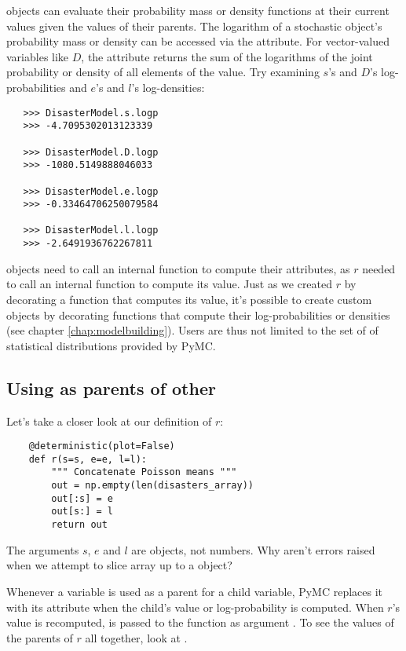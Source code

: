  objects can evaluate their probability mass or density functions at their current values given the values of their parents. The logarithm of a stochastic object's probability mass or density can be accessed via the  attribute. For vector-valued variables like $D$, the  attribute returns the sum of the logarithms of the joint probability or density of all elements of the value. Try examining $s$'s and $D$'s log-probabilities and $e$'s and $l$'s log-densities:
\begin{verbatim}
   >>> DisasterModel.s.logp
   >>> -4.7095302013123339

   >>> DisasterModel.D.logp
   >>> -1080.5149888046033

   >>> DisasterModel.e.logp
   >>> -0.33464706250079584

   >>> DisasterModel.l.logp
   >>> -2.6491936762267811
\end{verbatim}
 objects need to call an internal function to compute their  attributes, as $r$ needed to call an internal function to compute its value. Just as we created $r$ by decorating a function that computes its value, it's possible to create custom  objects by decorating functions that compute their log-probabilities or densities (see chapter \ref{chap:modelbuilding}). Users are thus not limited to the set of of statistical distributions provided by PyMC.

\subsection[Using Variables as parents of other Variables]{Using
 as parents of other }

Let's take a closer look at our definition of $r$:
\begin{verbatim}
	@deterministic(plot=False)
	def r(s=s, e=e, l=l):
	    """ Concatenate Poisson means """
	    out = np.empty(len(disasters_array))
	    out[:s] = e
	    out[s:] = l
	    return out
\end{verbatim}
The arguments $s$, $e$ and $l$ are  objects, not numbers. Why aren't errors raised when we attempt to slice array  up to a  object?

Whenever a variable is used as a parent for a child variable, PyMC replaces it with its  attribute when the child's value or log-probability is computed. When $r$'s value is recomputed,  is passed to the function as argument . To see the values of the parents of $r$ all together, look at .

